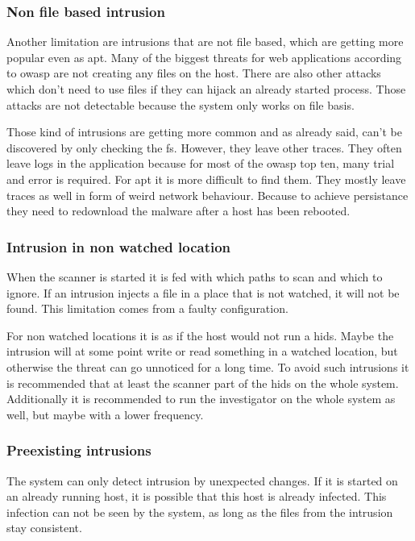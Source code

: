 \documentclass[
	a4paper,					%
	10pt,							%
	twoside,					%
	openright,				%
	notitlepage,			%
	parskip=half,			%
]{scrreprt}					%
\begin{document}
\subsubsection{Non file based intrusion}
\label{sec:limitation:nonFileBased}
Another limitation are intrusions that are not file based, which are getting more popular even as \gls{apt}. Many of the biggest threats for web applications according to \gls{owasp} are not creating any files on the host. \cite{owasp} There are also other attacks which don't need to use files if they can hijack an already started process. Those attacks are not detectable because the system only works on file basis.

Those kind of intrusions are getting more common and as already said, can't be discovered by only checking the \gls{fs}. However, they leave other traces. They often leave logs in the application because for most of the \gls{owasp} top ten, many trial and error is required. For \gls{apt} it is more difficult to find them. They mostly leave traces as well in form of weird network behaviour. Because to achieve persistance they need to redownload the malware after a host has been rebooted.

\subsubsection{Intrusion in non watched location}
\label{sec:limitation:nonWatched}
When the scanner is started it is fed with which paths to scan and which to ignore. If an intrusion injects a file in a place that is not watched, it will not be found. This limitation comes from a faulty configuration.

For non watched locations it is as if the host would not run a \gls{hids}. Maybe the intrusion will at some point write or read something in a watched location, but otherwise the threat can go unnoticed for a long time. To avoid such intrusions it is recommended that at least the scanner part of the \gls{hids} on the whole system. Additionally it is recommended to run the investigator on the whole system as well, but maybe with a lower frequency.

\subsubsection{Preexisting intrusions}
\label{sec:limitation:preexisting}
The system can only detect intrusion by unexpected changes. If it is started on an already running host, it is possible that this host is already infected. This infection can not be seen by the system, as long as the files from the intrusion stay consistent. 
\end{document}
